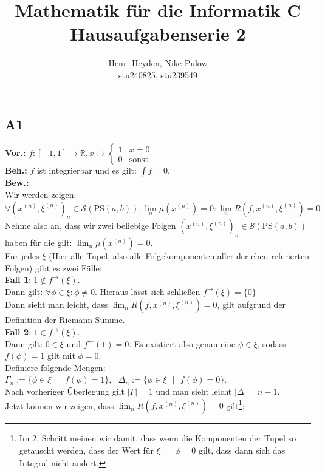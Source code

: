 \documentclass[12pt, a4paper]{article}
\title{Mathematik für die Informatik C\\Hausaufgabenserie 2}
\author{Henri Heyden, Nike Pulow \\ \small stu240825, stu239549}
\date{}
\newcommand*{\gap}{\text{ }}
\newcommand*{\setDef}{\gap|\gap}
\newcommand*{\vor}{\textbf{Vor.:} \gap}
\newcommand*{\beh}{\textbf{Beh.:} \gap}
\newcommand*{\bew}{\textbf{Bew.:} \gap}
\newcommand*{\R}{\mathbb R}
\begin{document}
\maketitle

\doublespacing

\subsection*{A1}
\vor \(f: [-1, 1] \rightarrow \R, x \mapsto \begin{cases}
    1 & x = 0 \\
    0 & \text{sonst}
\end{cases}\) \\
\beh \(f\) ist integrierbar und es gilt: \(\int f = 0\). \\
\bew \\Wir werden zeigen: \[\forall (x^{(n)}, \xi^{(n)})_n \in \mathcal S(\text{PS} (a,b)), \lim_n \mu(x^{(n)}) = 0 : \lim_{n} R(f, x^{(n)}, \xi^{(n)}) = 0\]
Nehme also an, dass wir zwei beliebige Folgen \((x^{(n)}, \xi^{(n)})_n \in \mathcal S(\text{PS} (a,b))\) haben für die gilt: \(\lim_n \mu(x^{(n)}) = 0\). \\
Für jedes \(\xi\) (Hier alle Tupel, also alle Folgekomponenten aller der eben referierten Folgen) gibt es zwei Fälle: \\
\textbf{Fall 1}: \(1 \not\in f^\rightarrow(\xi)\). \\
Dann gilt: \(\forall \phi \in \xi: \phi \ne 0\). Hieraus lässt sich schließen \(f^\rightarrow(\xi) = \{0\}\) \\
Dann sieht man leicht, dass \(\lim_{n} R(f, x^{(n)}, \xi^{(n)}) = 0\), gilt aufgrund der Definition der Riemann-Summe. \\
\textbf{Fall 2}: \(1 \in f^\rightarrow(\xi)\). \\
Dann gilt: \(0 \in \xi\) und \(f^\leftarrow (1) = 0\). Es existiert also genau eine \(\phi \in \xi\), sodass \(f(\phi) = 1\) gilt mit \(\phi = 0\). \\
Definiere folgende Mengen:\\
\(\Gamma_n := \{\phi \in \xi \setDef f(\phi) = 1\}, \gap \Delta_n := \{\phi \in \xi \setDef f(\phi) = 0\}\). \\
Nach vorheriger Überlegung gilt \(|\Gamma| = 1\) und man sieht leicht \(|\Delta| = n - 1\). \\
Jetzt können wir zeigen, dass \(\lim_{n} R(f, x^{(n)}, \xi^{(n)}) = 0\) gilt\footnote[1]{Im 2. Schritt meinen wir damit, dass wenn die Komponenten der Tupel so getauscht werden, dass der Wert für \(\xi_1 = \phi = 0\) gilt, dass dann sich das Integral nicht ändert.}:
\end{document}
